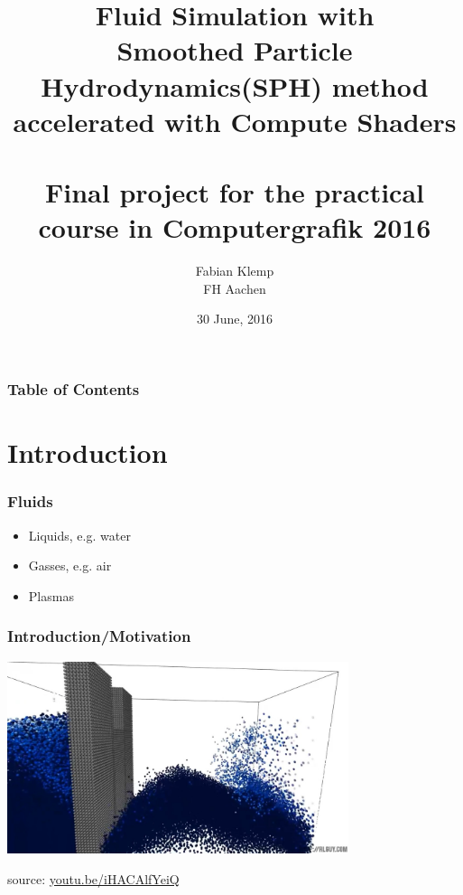 \documentclass{beamer}
\title{
    Fluid Simulation with\\
    Smoothed Particle Hydrodynamics(SPH) method\\
    accelerated with Compute Shaders\\
    ${\quad}$\\
    \small{Final project for the practical course in Computergrafik 2016}
}
\author{Fabian Klemp\\
    \small{FH Aachen}\\
}
\date{30 June, 2016}
\begin{document}
{
\begin{frame}[noframenumbering]
    \maketitle
\end{frame}
}
\begin{frame}
    \frametitle{Table of Contents}
    \tableofcontents
\end{frame}

\section{Introduction}
\begin{frame}
    \frametitle{Fluids}
    \begin{itemize}
        \item Liquids, e.g. water
        \item Gasses, e.g. air
        \item Plasmas
    \end{itemize}
\end{frame}
\begin{frame}
    \frametitle{Introduction/Motivation}
    \begin{center}
        \includegraphics[width=10cm]{introduction.jpg}
    \end{center}
    \begin{flushright}
        source: \href{https://youtu.be/iHACAlfYeiQ}{youtu.be/iHACAlfYeiQ}
    \end{flushright}
\end{frame}
\end{document}

